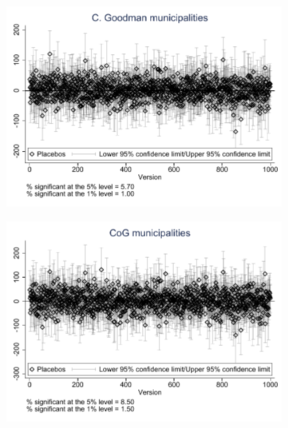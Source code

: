 \documentclass{article}
\begin{document}
\begin{landscape}
\clearpage


\begin{figure}[htbp]
    \centering
    \caption{Placebo Tests, Balanced Controls}
    \begin{subfigure}{0.4\textwidth}
        \includegraphics[width=\linewidth]{figures/exogeneity_tests/D17_placebo_cgoodman_new_ctrls.pdf}
        \label{fig:sub1}
    \end{subfigure}
    \begin{subfigure}{0.4\textwidth}
        \includegraphics[width=\linewidth]{figures/exogeneity_tests//D17_placebo_gen_muni_new_ctrls.pdf}
        \label{fig:sub2}
    \end{subfigure}
    \begin{subfigure}{0.4\textwidth}

\end{subfigure}
\end{figure}
\end{landscape}
\end{document}
